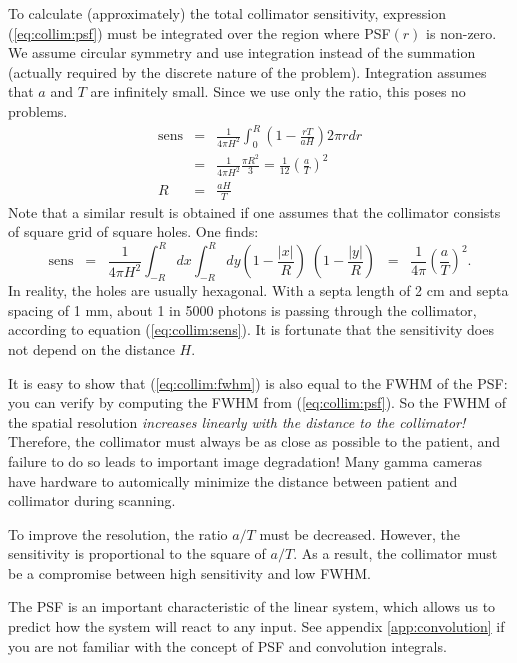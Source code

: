 To calculate (approximately) the total collimator sensitivity, expression
(\ref{eq:collim:psf}) must be integrated over the region where PSF$(r)$ is
non-zero. We assume circular symmetry and use integration instead of the
summation (actually required by the discrete nature of the problem).
Integration assumes that $a$ and $T$ are infinitely small. Since we use only
the ratio, this poses no problems.
%
\begin{eqnarray}
\mbox{sens} & = & \frac{1}{4 \pi H^2}
                  \int_0^R (1 - \frac{r T}{a H}) 2 \pi r dr \nonumber\\
            & = & \frac{1}{4 \pi H^2}\frac{\pi R^2}{3}
              = \frac{1}{12} \left( \frac{a}{T} \right)^2
    \label{eq:collim:sens}\\
R & = & \frac{a H}{T}  \label{eq:collim:fwhm}
\end{eqnarray}
%
Note that a similar result is obtained if one assumes that the
collimator consists of square grid of square holes. One finds:
\begin{equation}
\mbox{sens} \;\; = \;\;  \frac{1}{4 \pi H^2} 
  \int_{-R}^{R} dx \int_{-R}^{R} dy (1 - \frac{|x|}{R}) \; (1 -
  \frac{|y|}{R})
  \;\; = \;\; \frac{1}{4 \pi} \left( \frac{a}{T} \right)^2.
\end{equation}
In reality, the holes are usually hexagonal. With a septa length of 2
cm and septa spacing of 1 mm, about 1 in 5000 photons is passing
through the collimator, according to equation
(\ref{eq:collim:sens}). It is fortunate that the sensitivity does not
depend on the distance $H$.


It is easy to show that (\ref{eq:collim:fwhm}) is also equal to the FWHM of the
PSF: you can verify by computing the FWHM from (\ref{eq:collim:psf}). So the
FWHM of the spatial resolution {\em increases linearly with the distance to
the collimator!}  Therefore, the collimator must always be as close as
possible to the patient, and failure to do so leads to important image
degradation! Many gamma cameras have hardware to automically minimize
the distance between patient and collimator during scanning.

To improve the resolution, the ratio $a/T$ must be decreased. However, the
sensitivity is proportional to the square of $a/T$. As a result, the
collimator must be a compromise between high sensitivity and low FWHM.

The PSF is an important characteristic of the linear system, which allows us
to predict how the system will react to any input. See appendix
\ref{app:convolution} if you are not familiar with the concept of PSF and
convolution integrals.

